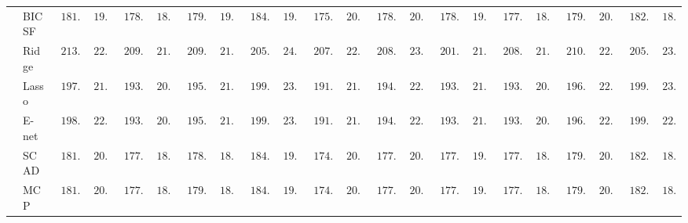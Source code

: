 \begin{tabular}{p{0.2cm}p{1cm}|p{0.6cm}p{0.6cm}|p{0.6cm}p{0.6cm}p{0.6cm}p{0.6cm}p{0.6cm}p{0.6cm}|p{0.6cm}p{0.6cm}p{0.6cm}p{0.6cm}p{0.6cm}p{0.6cm}|p{0.6cm}p{0.6cm}p{0.6cm}p{0.6cm}p{0.6cm}p{0.6cm}}
 & BIC SF  & $\phantom{0}181.93$ & $\phantom{0}19.98$ & $\phantom{0}178.03$ & $\phantom{0}18.19$ & $\phantom{0}179.56$ & $\phantom{0}19.30$ & $\phantom{0}184.62$ & $\phantom{0}19.12$ & $\phantom{0}175.60$ & $\phantom{0}20.12$ & $\phantom{0}178.02$ & $\phantom{0}20.72$ & $\phantom{0}178.02$ & $\phantom{0}19.72$ & $\phantom{0}177.96$ & $\phantom{0}18.17$ & $\phantom{0}179.54$ & $\phantom{0}20.65$ & $\phantom{0}182.36$ & $\phantom{0}18.61$ \\
 & Ridge  & $\phantom{0}213.07$ & $\phantom{0}22.18$ & $\phantom{0}209.45$ & $\phantom{0}21.25$ & $\phantom{0}209.58$ & $\phantom{0}21.46$ & $\phantom{0}205.13$ & $\phantom{0}24.08$ & $\phantom{0}207.25$ & $\phantom{0}22.26$ & $\phantom{0}208.19$ & $\phantom{0}23.89$ & $\phantom{0}201.54$ & $\phantom{0}21.18$ & $\phantom{0}208.38$ & $\phantom{0}21.07$ & $\phantom{0}210.38$ & $\phantom{0}22.20$ & $\phantom{0}205.66$ & $\phantom{0}23.11$ \\
 & Lasso  & $\phantom{0}197.97$ & $\phantom{0}21.81$ & $\phantom{0}193.68$ & $\phantom{0}20.48$ & $\phantom{0}195.44$ & $\phantom{0}21.44$ & $\phantom{0}199.87$ & $\phantom{0}23.85$ & $\phantom{0}191.33$ & $\phantom{0}21.59$ & $\phantom{0}194.22$ & $\phantom{0}22.64$ & $\phantom{0}193.17$ & $\phantom{0}21.26$ & $\phantom{0}193.83$ & $\phantom{0}20.93$ & $\phantom{0}196.42$ & $\phantom{0}22.21$ & $\phantom{0}199.16$ & $\phantom{0}23.05$ \\
 & E-net  & $\phantom{0}198.26$ & $\phantom{0}22.03$ & $\phantom{0}193.70$ & $\phantom{0}20.60$ & $\phantom{0}195.55$ & $\phantom{0}21.51$ & $\phantom{0}199.91$ & $\phantom{0}23.74$ & $\phantom{0}191.64$ & $\phantom{0}21.62$ & $\phantom{0}194.20$ & $\phantom{0}22.50$ & $\phantom{0}193.34$ & $\phantom{0}21.04$ & $\phantom{0}193.85$ & $\phantom{0}20.88$ & $\phantom{0}196.24$ & $\phantom{0}22.25$ & $\phantom{0}199.44$ & $\phantom{0}22.53$ \\
 & SCAD  & $\phantom{0}181.27$ & $\phantom{0}20.01$ & $\phantom{0}177.24$ & $\phantom{0}18.22$ & $\phantom{0}178.84$ & $\phantom{0}18.71$ & $\phantom{0}184.75$ & $\phantom{0}19.29$ & $\phantom{0}174.89$ & $\phantom{0}20.32$ & $\phantom{0}177.65$ & $\phantom{0}20.59$ & $\phantom{0}177.89$ & $\phantom{0}19.26$ & $\phantom{0}177.52$ & $\phantom{0}18.13$ & $\phantom{0}179.61$ & $\phantom{0}20.48$ & $\phantom{0}182.82$ & $\phantom{0}18.76$ \\
 & MCP  & $\phantom{0}181.32$ & $\phantom{0}20.18$ & $\phantom{0}177.14$ & $\phantom{0}18.25$ & $\phantom{0}179.04$ & $\phantom{0}18.79$ & $\phantom{0}184.83$ & $\phantom{0}19.27$ & $\phantom{0}174.84$ & $\phantom{0}20.38$ & $\phantom{0}177.51$ & $\phantom{0}20.54$ & $\phantom{0}177.73$ & $\phantom{0}19.24$ & $\phantom{0}177.47$ & $\phantom{0}18.17$ & $\phantom{0}179.55$ & $\phantom{0}20.59$ & $\phantom{0}182.82$ & $\phantom{0}18.78$ \\

\end{tabular}
